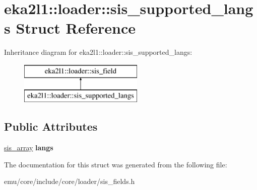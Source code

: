 \hypertarget{structeka2l1_1_1loader_1_1sis__supported__langs}{}\section{eka2l1\+:\+:loader\+:\+:sis\+\_\+supported\+\_\+langs Struct Reference}
\label{structeka2l1_1_1loader_1_1sis__supported__langs}
Inheritance diagram for eka2l1\+:\+:loader\+:\+:sis\+\_\+supported\+\_\+langs\+:\begin{figure}[H]
\begin{center}
\leavevmode
\includegraphics[height=2.000000cm]{structeka2l1_1_1loader_1_1sis__supported__langs}
\end{center}
\end{figure}
\subsection*{Public Attributes}
\begin{DoxyCompactItemize}
\item 
\mbox{\label{structeka2l1_1_1loader_1_1sis__supported__langs_ac4df317d4b9f480aa95acecc30caed77}} 
\mbox{\hyperlink{structeka2l1_1_1loader_1_1sis__array}{sis\+\_\+array}} {\bfseries langs}
\end{DoxyCompactItemize}


The documentation for this struct was generated from the following file\+:\begin{DoxyCompactItemize}
\item 
emu/core/include/core/loader/sis\+\_\+fields.\+h\end{DoxyCompactItemize}
